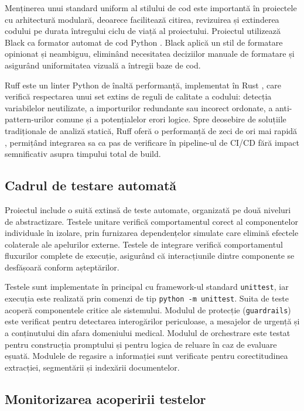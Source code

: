 \documentclass[12pt, a4paper, oneside, romanian]{teza-upb}
\begin{document}
Menținerea unui standard uniform al stilului de cod este importantă în proiectele cu arhitectură modulară, deoarece facilitează citirea, revizuirea și extinderea codului pe durata întregului ciclu de viață al proiectului. Proiectul utilizează Black ca formator automat de cod Python \cite{black_doc}. Black aplică un stil de formatare opinionat și neambiguu, eliminând necesitatea deciziilor manuale de formatare și asigurând uniformitatea vizuală a întregii baze de cod.

Ruff este un linter Python de înaltă performanță, implementat în Rust \cite{ruff_doc}, care verifică respectarea unui set extins de reguli de calitate a codului: detecția variabilelor neutilizate, a importurilor redundante sau incorect ordonate, a anti-pattern-urilor comune și a potențialelor erori logice. Spre deosebire de soluțiile tradiționale de analiză statică, Ruff oferă o performanță de zeci de ori mai rapidă \cite{ruff_doc}, permițând integrarea sa ca pas de verificare în pipeline-ul de CI/CD fără impact semnificativ asupra timpului total de build.

\subsection{Cadrul de testare automată}

Proiectul include o suită extinsă de teste automate, organizată pe două niveluri de abstractizare. Testele unitare verifică comportamentul corect al componentelor individuale în izolare, prin furnizarea dependențelor simulate care elimină efectele colaterale ale apelurilor externe. Testele de integrare verifică comportamentul fluxurilor complete de execuție, asigurând că interacțiunile dintre componente se desfășoară conform așteptărilor.

Testele sunt implementate în principal cu framework-ul standard \texttt{unittest}, iar execuția este realizată prin comenzi de tip \texttt{python -m unittest}. Suita de teste acoperă componentele critice ale sistemului. Modulul de protecție (\texttt{guardrails}) este verificat pentru detectarea interogărilor periculoase, a mesajelor de urgență și a conținutului din afara domeniului medical. Modulul de orchestrare este testat pentru construcția promptului și pentru logica de reluare în caz de evaluare eșuată. Modulele de regasire a informației sunt verificate pentru corectitudinea extracției, segmentării și indexării documentelor.

\subsection{Monitorizarea acoperirii testelor}
\end{document}
